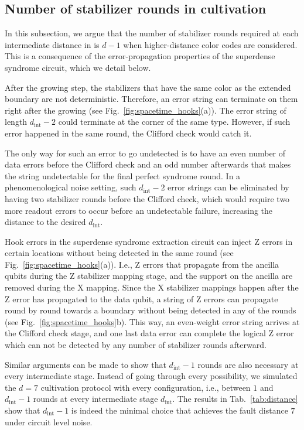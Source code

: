 \subsection{Number of stabilizer rounds in cultivation}
\label{sec:cultivation_depth}

In this subsection, we argue that the number of stabilizer rounds required at each intermediate distance in \cite{gidneyMagicStateCultivation2024} is $d-1$ when higher-distance color codes are considered. This is a consequence of the error-propagation properties of the superdense syndrome circuit, which we detail below.

After the growing step, the stabilizers that have the same color as the extended boundary are not deterministic. Therefore, an error string can terminate on them right after the growing (see Fig.~\ref{fig:spacetime_hooks}(a)). The error string of length $d_\text{int}-2$ could terminate at the corner of the same type. However, if such error happened in the same round, the Clifford check would catch it. 

The only way for such an error to go undetected is to have an even number of data errors before the Clifford check and an odd number afterwards that makes the string undetectable for the final perfect syndrome round. In a phenomenological noise setting, such $d_\text{int}-2$ error strings can be eliminated by having two stabilizer rounds before the Clifford check, which would require two more readout errors to occur before an undetectable failure, increasing the distance to the desired $d_\text{int}$.

Hook errors in the superdense syndrome extraction circuit can inject Z errors in certain locations without being detected in the same round (see Fig.~\ref{fig:spacetime_hooks}(a)). I.e., Z errors that propagate from the ancilla qubits during the Z stabilizer mapping stage, and the support on the ancilla are removed during the X mapping. Since the X stabilizer mappings happen after the Z error has propagated to the data qubit, a string of Z errors can propagate round by round towards a boundary without being detected in any of the rounds (see Fig.~\ref{fig:spacetime_hooks}b). This way, an even-weight error string arrives at the Clifford check stage, and one last data error can complete the logical Z error which can not be detected by any number of stabilizer rounds afterward.

Similar arguments can be made to show that $d_\text{int}-1$ rounds are also necessary at every intermediate stage. Instead of going through every possibility, we simulated the $d=7$ cultivation protocol with every configuration, i.e., between $1$ and $d_\text{int}-1$ rounds at every intermediate stage $d_\text{int}$. The results in Tab.~\ref{tab:distance} show that $d_\text{int}-1$ is indeed the minimal choice that achieves the fault distance $7$ under circuit level noise.

